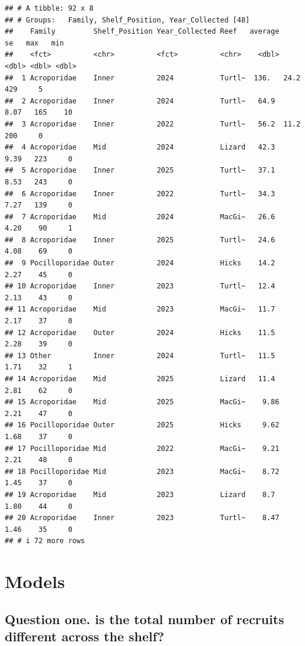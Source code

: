 \documentclass[
]{article}
\begin{document}
\begin{verbatim}
## # A tibble: 92 x 8
## # Groups:   Family, Shelf_Position, Year_Collected [48]
##    Family         Shelf_Position Year_Collected Reef   average    se   max   min
##    <fct>          <chr>          <fct>          <chr>    <dbl> <dbl> <dbl> <dbl>
##  1 Acroporidae    Inner          2024           Turtl~  136.   24.2    429     5
##  2 Acroporidae    Inner          2024           Turtl~   64.9   8.07   165    10
##  3 Acroporidae    Inner          2022           Turtl~   56.2  11.2    200     0
##  4 Acroporidae    Mid            2024           Lizard   42.3   9.39   223     0
##  5 Acroporidae    Inner          2025           Turtl~   37.1   8.53   243     0
##  6 Acroporidae    Inner          2022           Turtl~   34.3   7.27   139     0
##  7 Acroporidae    Mid            2024           MacGi~   26.6   4.20    90     1
##  8 Acroporidae    Inner          2025           Turtl~   24.6   4.08    69     0
##  9 Pocilloporidae Outer          2024           Hicks    14.2   2.27    45     0
## 10 Acroporidae    Inner          2023           Turtl~   12.4   2.13    43     0
## 11 Acroporidae    Mid            2023           MacGi~   11.7   2.17    37     0
## 12 Acroporidae    Outer          2024           Hicks    11.5   2.28    39     0
## 13 Other          Inner          2024           Turtl~   11.5   1.71    32     1
## 14 Acroporidae    Mid            2025           Lizard   11.4   2.81    62     0
## 15 Acroporidae    Mid            2025           MacGi~    9.86  2.21    47     0
## 16 Pocilloporidae Outer          2025           Hicks     9.62  1.68    37     0
## 17 Pocilloporidae Mid            2022           MacGi~    9.21  2.21    48     0
## 18 Pocilloporidae Mid            2023           MacGi~    8.72  1.45    37     0
## 19 Acroporidae    Mid            2023           Lizard    8.7   1.80    44     0
## 20 Acroporidae    Inner          2023           Turtl~    8.47  1.46    35     0
## # i 72 more rows
\end{verbatim}

\section{Models}\label{models}

\subsection{Question one. is the total number of recruits different
across the
shelf?}\label{question-one.-is-the-total-number-of-recruits-different-across-the-shelf}
\end{document}
